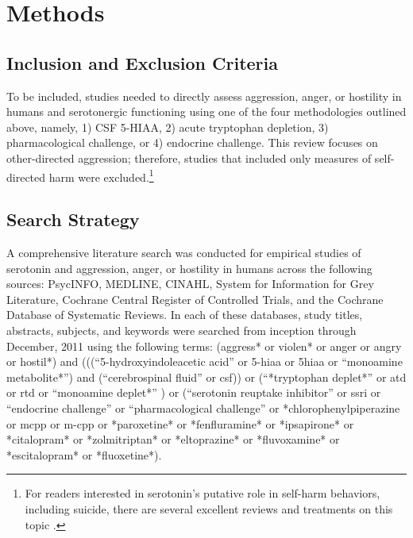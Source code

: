 \documentclass[jou]{apa6}
\begin{document}
\maketitle
\section{Methods}
\subsection{Inclusion and Exclusion Criteria}
To be included, studies needed to directly assess aggression, anger, or hostility in humans and serotonergic functioning using one of the four methodologies outlined above, namely, 
1) CSF 5-HIAA, 2) acute tryptophan depletion, 3) pharmacological challenge, or 4) endocrine challenge.
This review focuses on other-directed aggression; therefore, studies that included only measures of self-directed harm were excluded.\footnote{For readers interested in serotonin's putative role in self-harm behaviors, including suicide, there are several excellent reviews and treatments on this topic \parencite[e.g.,][]{Lester1995, Mueller2004, Desmyter2011}.}


\subsection{Search Strategy}
A comprehensive literature search was conducted for empirical studies of serotonin and aggression, anger, or hostility in humans across the following sources: PsycINFO, MEDLINE, CINAHL, System  for  Information  for  Grey Literature, Cochrane Central Register of Controlled Trials, and the Cochrane Database of Systematic Reviews. In each of these databases, study titles, abstracts, subjects, and keywords were searched from inception through December, 2011 using the following terms: \sc (aggress* or violen* or anger or angry or hostil*) and (((``5-hydroxy\-indole\-acetic acid'' or 5-hiaa or 5hiaa or ``mono\-amine metabo\-lite*'') and (``cerebro\-spinal fluid'' or csf)) or (``*tryptophan deplet*'' or atd or rtd or ``monoamine deplet*'' ) or (``serotonin reuptake inhibitor'' or ssri or ``endocrine challenge'' or ``pharmacological challenge'' or *chlorophenylpiperazine or mcpp or m-cpp or *paroxetine* or *fenfluramine* or *ipsapirone* or *citalopram* or *zolmitriptan* or *eltoprazine* or *fluvoxamine* or *escitalopram* or *fluoxetine*). \rm
\end{document}
